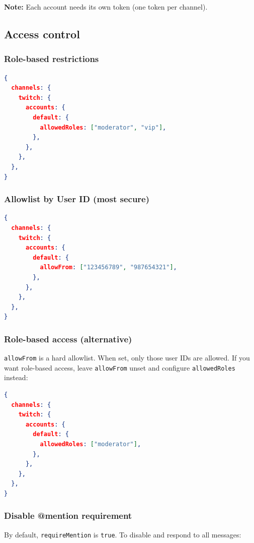 \textbf{Note:} Each account needs its own token (one token per channel).

\subsection{Access control}


\subsubsection{Role-based restrictions}


\begin{lstlisting}[language=json]
{
  channels: {
    twitch: {
      accounts: {
        default: {
          allowedRoles: ["moderator", "vip"],
        },
      },
    },
  },
}
\end{lstlisting}


\subsubsection{Allowlist by User ID (most secure)}


\begin{lstlisting}[language=json]
{
  channels: {
    twitch: {
      accounts: {
        default: {
          allowFrom: ["123456789", "987654321"],
        },
      },
    },
  },
}
\end{lstlisting}


\subsubsection{Role-based access (alternative)}


\texttt{allowFrom} is a hard allowlist. When set, only those user IDs are allowed.
If you want role-based access, leave \texttt{allowFrom} unset and configure \texttt{allowedRoles} instead:

\begin{lstlisting}[language=json]
{
  channels: {
    twitch: {
      accounts: {
        default: {
          allowedRoles: ["moderator"],
        },
      },
    },
  },
}
\end{lstlisting}


\subsubsection{Disable @mention requirement}


By default, \texttt{requireMention} is \texttt{true}. To disable and respond to all messages:

